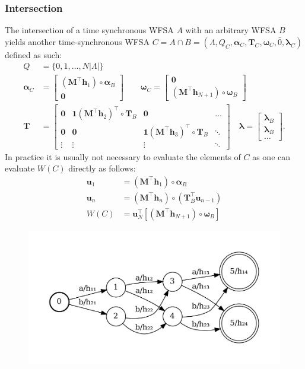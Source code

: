 \subsubsection{Intersection}
The intersection of a time synchronous WFSA $A$ with an arbitrary WFSA $B$ yields another time-synchronous WFSA $C = A \cap B = (\Lambda, Q_C, \boldsymbol{\alpha}_C, \mathbf{T}_C
, \boldsymbol{\omega}_C, \bar{0}, \boldsymbol{\lambda}_C)$ defined as such:
\begin{align}
    Q &= \{0, 1, \dots, N|\Lambda| \} \\
    \boldsymbol{\alpha}_C &= \begin{bmatrix}
        (\mathbf{M}^\top \mathbf{h}_1) \circ \boldsymbol{\alpha}_B \\ \mathbf{0}
    \end{bmatrix} \qquad \boldsymbol{\omega}_C = \begin{bmatrix}
        \mathbf{0} \\(\mathbf{M}^\top \mathbf{h}_{N+1}) \circ \boldsymbol{\omega}_B 
    \end{bmatrix} \\
    \mathbf{T} &= \begin{bmatrix}
        \mathbf{0} & \mathbf{1} (\mathbf{M}^\top \mathbf{h}_2)^\top \circ \mathbf{T}_B & \mathbf{0} & \dots\\
        \mathbf{0} & \mathbf{0} & \mathbf{1} (\mathbf{M}^\top \mathbf{h}_3)^\top \circ \mathbf{T}_B & \ddots \\
        \vdots & \vdots & \vdots & \ddots 
    \end{bmatrix} \quad \boldsymbol{\lambda} = \begin{bmatrix} 
        \boldsymbol{\lambda}_B \\ \boldsymbol{\lambda}_B \\ \dots
    \end{bmatrix}.
\end{align}
In practice it is usually not necessary to evaluate the elements of $C$ as one can evaluate $W(C)$ directly as follows:
\begin{align}
    \mathbf{u}_1 &= (\mathbf{M}^\top \mathbf{h}_1) \circ \boldsymbol{\alpha}_B \\
    \mathbf{u}_n &= (\mathbf{M}^\top \mathbf{h}_n) \circ (\mathbf{T}_B^\top \mathbf{u}_{n-1}) \\
    W(C) &= \mathbf{u}_N^\top [(\mathbf{M}^\top \mathbf{h}_{N+1}) \circ \boldsymbol{\omega}_B]
\end{align}

\begin{figure}[t] 
    \centering 
    \includegraphics[width=0.7\linewidth]{images/dense.pdf}
    \label{fig:dense_fsa}
\end{figure}


